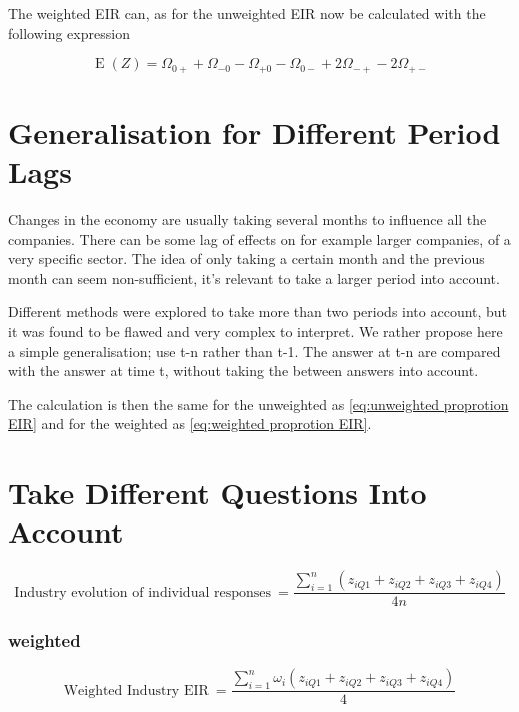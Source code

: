 \documentclass[12pt,a4paper,oneside]{book}
\DeclareMathOperator{\E}{E}
\begin{document}
The weighted EIR can, as for the unweighted EIR now be calculated with the following expression 

\begin{equation}
    \E(Z) = \Omega_{0+} + \Omega_{-0} - \Omega_{+0} - \Omega_{0-} +2\Omega_{-+} -2\Omega_{+-} \label{eq:weighted proprotion EIR}
\end{equation}


\section{Generalisation for Different Period Lags}

Changes in the economy are usually taking several months to influence all the companies. There can be some lag of effects on for example larger companies, of a very specific sector.
The idea of only taking a certain month and the previous month can seem non-sufficient, it's relevant to take a larger period into account. 

Different methods were explored to take more than two periods into account, but it was found to be flawed and very complex to interpret.
We rather propose here a simple generalisation; use t-n rather than t-1. 
The answer at t-n are compared with the answer at time t, without taking the between answers into account.

The calculation is then the same for the unweighted as \autoref{eq:unweighted proprotion EIR} and for the weighted as \autoref{eq:weighted proprotion EIR}.


\section{Take Different Questions Into Account}


\begin{equation}
    \mbox{Industry evolution of individual responses}\ = \frac{\sum_{i=1}^n \left(z_{i Q1} + z_{i Q2} + z_{i Q3} + z_{i Q4} \right)}{4n}
\end{equation}





\subsubsection{weighted}

\begin{equation}
    \mbox{Weighted Industry EIR}\ = \frac{ \sum_{i=1}^n \omega_i \left(z_{i Q1} + z_{i Q2} + z_{i Q3} + z_{i Q4} \right)}{4}
\end{equation}
\end{document}
